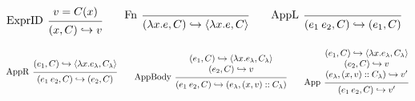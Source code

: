 \documentclass[acmsmall,screen,review]{acmart}\settopmatter{printfolios=true,printccs=false,printacmref=false}
\newcommand*{\cons}{::}
\newcommand*{\semarrow}{\hookrightarrow}
\begin{document}
\begin{figure}[h!]
  \scriptsize
  \begin{flushright}
    \fbox{$(e,C)\semarrow V\text{ or }(e',C')$}
  \end{flushright}
  \centering
  \vspace{0pt} %
  \[
    \begin{prooftree}
      \hypo{v=C(x)}
      \infer[left label=ExprID]1{
      (x, C)
      \semarrow
      v
      }
    \end{prooftree}\qquad
    \begin{prooftree}
      \infer[left label=Fn]0{
      (\lambda x.e, C)
      \semarrow
      \langle\lambda x.e, C\rangle
      }
    \end{prooftree}\qquad
    \begin{prooftree}
      \infer[left label={AppL}]0{
      (e_{1}\:e_{2}, C)
      \semarrow
      (e_{1},C)
      }
    \end{prooftree}
  \]

  \[
    \begin{prooftree}
      \hypo{
        \begin{matrix}
          (e_{1}, C)
          \semarrow
          \langle\lambda x.e_{\lambda}, C_{\lambda}\rangle
        \end{matrix}
      }
      \infer[left label={AppR}]1{
      (e_{1}\:e_{2}, C)
      \semarrow
      (e_{2}, C)
      }
    \end{prooftree}\qquad
    \begin{prooftree}
      \hypo{
        \begin{matrix}
          (e_{1}, C)
          \semarrow
          \langle\lambda x.e_{\lambda}, C_{\lambda}\rangle \\
          (e_{2}, C)
          \semarrow
          v
        \end{matrix}
      }
      \infer[left label={AppBody}]1{
      (e_{1}\:e_{2}, C)
      \semarrow
      (e_{\lambda}, (x, v)\cons C_{\lambda})
      }
    \end{prooftree}\qquad
    \begin{prooftree}
      \hypo{
        \begin{matrix}
          (e_{1}, C)
          \semarrow
          \langle\lambda x.e_{\lambda}, C_{\lambda}\rangle \\
          (e_{2}, C)
          \semarrow
          v                                                \\
          (e_{\lambda}, (x, v)\cons C_{\lambda})
          \semarrow
          v'
        \end{matrix}
      }
      \infer[left label={App}]1{
      (e_{1}\:e_{2}, C)
      \semarrow
      v'
      }
    \end{prooftree}
  \]


\end{figure}
\end{document}
